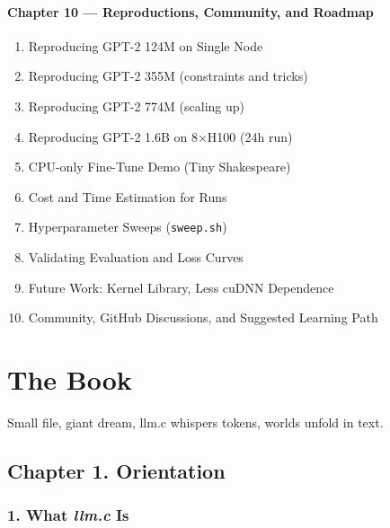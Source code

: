 \documentclass[
  letterpaper,
  DIV=11,
  numbers=noendperiod]{scrreprt}
\newenvironment{Shaded}{\begin{snugshade}}{\end{snugshade}}
\newcommand{\ExtensionTok}[1]{\textcolor[rgb]{0.00,0.23,0.31}{#1}}
\newcommand{\NormalTok}[1]{\textcolor[rgb]{0.00,0.23,0.31}{#1}}
\providecommand{\tightlist}{%
  \setlength{\itemsep}{0pt}\setlength{\parskip}{0pt}}
\begin{document}
\subsubsection{Chapter 10 --- Reproductions, Community, and
Roadmap}\label{chapter-10-reproductions-community-and-roadmap}

\begin{enumerate}
\def\labelenumi{\arabic{enumi}.}
\setcounter{enumi}{90}
\tightlist
\item
  Reproducing GPT-2 124M on Single Node
\item
  Reproducing GPT-2 355M (constraints and tricks)
\item
  Reproducing GPT-2 774M (scaling up)
\item
  Reproducing GPT-2 1.6B on 8×H100 (24h run)
\item
  CPU-only Fine-Tune Demo (Tiny Shakespeare)
\item
  Cost and Time Estimation for Runs
\item
  Hyperparameter Sweeps (\texttt{sweep.sh})
\item
  Validating Evaluation and Loss Curves
\item
  Future Work: Kernel Library, Less cuDNN Dependence
\item
  Community, GitHub Discussions, and Suggested Learning Path
\end{enumerate}


\chapter{The Book}\label{the-book}

\begin{Shaded}
\begin{Highlighting}[]
\ExtensionTok{Small}\NormalTok{ file, giant dream,}
\ExtensionTok{llm.c}\NormalTok{ whispers tokens,}
\ExtensionTok{worlds}\NormalTok{ unfold in text.}
\end{Highlighting}
\end{Shaded}

\section{Chapter 1. Orientation}\label{chapter-1.-orientation}

\subsection{\texorpdfstring{1. What \emph{llm.c}
Is}{1. What llm.c Is}}\label{what-llm.c-is}
\end{document}
